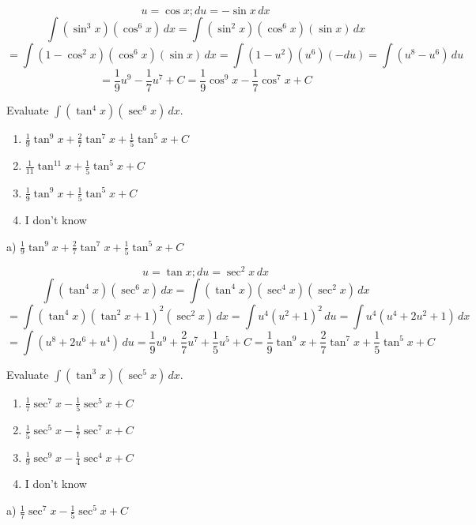 \documentclass[addpoints,12pt,answers]{exam}
\begin{document}
\begin{questions}
\begin{solution}
    $$u=\cos x; du=-\sin x\,dx$$
    $$\int(\sin^3 x)(\cos^6 x)\,dx=\int(\sin^2 x)(\cos^6 x)(\sin x)\,dx$$
    $$=\int(1-\cos^2 x)(\cos^6 x)(\sin x)\,dx=\int(1-u^2)(u^6)(-du)=\int(u^8-u^6)\,du$$
    $$=\frac{1}{9}u^9-\frac{1}{7}u^7+C=\frac{1}{9}\cos^9 x-\frac{1}{7}\cos^7 x+C$$
  \end{solution}
  \newpage
  \question
  Evaluate $\displaystyle\int(\tan^4 x)(\sec^6 x)\,dx$.
  \begin{enumerate}[label=\alph*)]
    \item
    $\displaystyle\frac{1}{9}\tan^9 x+\frac{2}{7}\tan^7 x+\frac{1}{5}\tan^5 x+C$
    \item
    $\displaystyle\frac{1}{11}\tan^{11}x+\frac{1}{5}\tan^5 x+C$
    \item
    $\displaystyle\frac{1}{9}\tan^9 x+\frac{1}{5}\tan^5 x+C$
    \item
    I don't know
  \end{enumerate}
  \begin{solution}
    a) $\displaystyle\frac{1}{9}\tan^9 x+\frac{2}{7}\tan^7 x+\frac{1}{5}\tan^5 x+C$
    
    $$u=\tan x; du=\sec^2 x\,dx$$
    $$\int(\tan^4 x)(\sec^6 x)\,dx=\int(\tan^4 x)(\sec^4 x)(\sec^2 x)\,dx$$
    $$=\int(\tan^4 x)(\tan^2 x+1)^2(\sec^2 x)\,dx=\int u^4(u^2+1)^2\,du=\int u^4(u^4+2u^2+1)\,dx$$
    $$=\int(u^8+2u^6+u^4)\,du=\frac{1}{9}u^9+\frac{2}{7}u^7+\frac{1}{5}u^5+C=\frac{1}{9}\tan^9 x+\frac{2}{7}\tan^7 x+\frac{1}{5}\tan^5 x+C$$
  \end{solution}
  \newpage
  \question
  Evaluate $\displaystyle\int(\tan^3 x)(\sec^5 x)\,dx$.
  \begin{enumerate}[label=\alph*)]
    \item
    $\displaystyle\frac{1}{7}\sec^7 x-\frac{1}{5}\sec^5 x+C$
    \item
    $\displaystyle\frac{1}{5}\sec^5 x-\frac{1}{7}\sec^7 x+C$
    \item
    $\displaystyle\frac{1}{9}\sec^9 x-\frac{1}{4}\sec^4 x+C$
    \item
    I don't know
  \end{enumerate}
  \begin{solution}
    a) $\displaystyle\frac{1}{7}\sec^7 x-\frac{1}{5}\sec^5 x+C$
    

\end{solution}
\end{questions}
\end{document}

